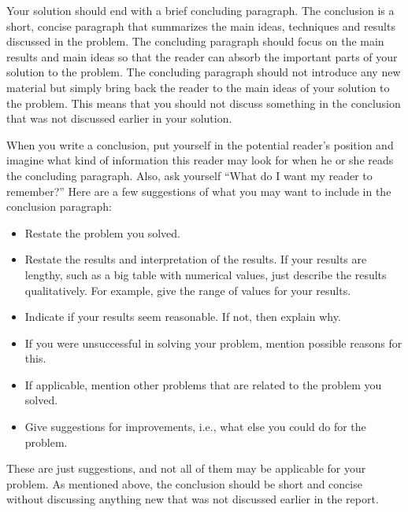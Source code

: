 %
%
%
%
%


Your solution should end with a brief concluding paragraph. The
conclusion is a short, concise paragraph that summarizes the main
ideas, techniques and results discussed in the problem.  The
concluding paragraph should focus on the main results and main ideas
so that the reader can absorb the important parts of your solution to
the problem. The concluding paragraph should not
introduce any new material but simply bring back the reader to the main ideas
of your solution to the problem. This means that you should not
discuss something in the conclusion that was not discussed earlier in
your solution.

When you write a conclusion, put yourself in the potential reader's
position and imagine what kind of information this reader may look for
when he or she reads the concluding paragraph.  Also, ask yourself
``What do I want my reader to remember?''  Here are a few suggestions
of what you may want to include in the conclusion paragraph:

\begin{itemize}
\item Restate the problem you solved.
\item Restate the results and interpretation of the results. If your
  results are lengthy, such as a big table with numerical values,
  just  describe the results qualitatively. For example,
  give the range of values for your results.
\item Indicate if your results seem reasonable. If not, then explain why.
\item If you were unsuccessful in solving your problem, mention
  possible reasons for this.
\item If applicable, mention other problems that are related to the
  problem you solved.
\item Give suggestions for improvements, i.e., what else you could do
  for the problem.
\end{itemize}

These are just suggestions, and not all of them may be applicable for
your problem.  As mentioned above, the conclusion should be short and
concise without discussing anything new that was not discussed earlier
in the report.



